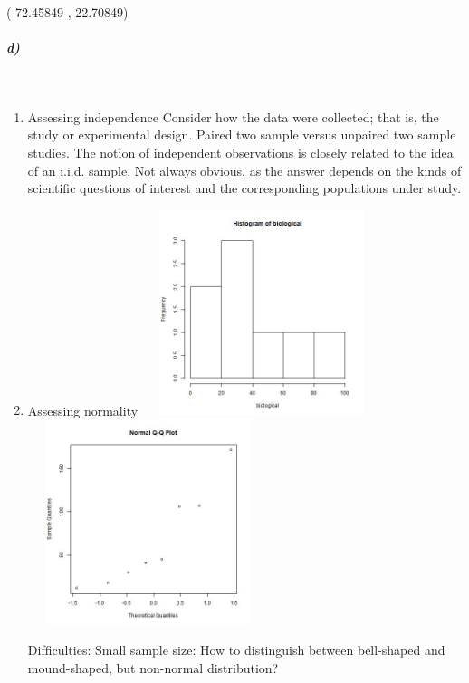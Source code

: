 \documentclass{article}
\begin{document}
 (-72.45849  , 22.70849)
\subparagraph{d)}~{}
\begin{enumerate}
\item Assessing independence
\subitem Consider how the data were collected; that is, the study or experimental design.
\subitem Paired two sample versus unpaired two sample studies.
\subitem The notion of independent observations is closely related to the idea of an i.i.d. sample.
\subitem Not always obvious, as the answer depends on the kinds of scientiﬁc questions of interest and the corresponding populations under study.
\item Assessing normality
\newline
\includegraphics[height=6cm,width=7cm]{biological.jpg}
\includegraphics[height=6cm,width=7cm]{chemistry.jpg}

Difﬁculties:
\subitem Small sample size:
\subitem How to distinguish between bell-shaped and mound-shaped, but non-normal distribution?


\end{enumerate}
\end{document}
